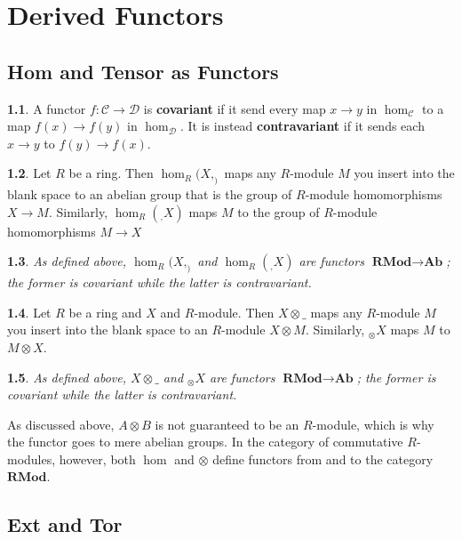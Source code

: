 \documentclass[oneside,english]{amsbook}
\numberwithin{section}{chapter}
\theoremstyle{plain}
\newtheorem{thm}{\protect\theoremname}
\theoremstyle{definition}
\newtheorem{defn}[thm]{\protect\definitionname}
\providecommand{\definitionname}{Definition}
\providecommand{\theoremname}{Theorem}
\begin{document}
	\chapter{Derived Functors}
	
		\section{Hom and Tensor as Functors}

			\begin{defn}
				A functor $f:\mathscr{C}\to \mathscr{D}$ is \textbf{covariant} if it send every map $x\to y$ in $\hom_\mathscr{C}$ to a map $f(x)\to f(y)$ in $\hom_\mathscr{D}$. It is instead \textbf{contravariant} if it sends each  $x\to y$ to $f(y)\to f(x)$.
			\end{defn}
			
			\begin{defn}
				Let $R$ be a ring. Then $\hom_R(X, _)$ maps any $R$-module $M$ you insert into the blank space to an abelian group that is the group of $R$-module homomorphisms $X\to M$. Similarly, $\hom_R(_, X)$ maps $M$ to the group of $R$-module homomorphisms $M\to X$
			\end{defn}
			
			\begin{thm}
				As defined above, $\hom_R(X, _)$ and $\hom_R(_, X)$ are functors $\textbf{RMod}\to \textbf{Ab}$; the former is covariant while the latter is contravariant.
			\end{thm}
			
			\begin{defn}
				Let $R$ be a ring and $X$ and $R$-module. Then $X\otimes \_ $ maps any $R$-module $M$ you insert into the blank space to an $R$-module $X\otimes M$. Similarly, $_\otimes X$ maps $M$ to $M\otimes X$.
			\end{defn}
			
			\begin{thm}
				As defined above, $X\otimes \_$ and $_\otimes X$ are functors  $\textbf{RMod}\to \textbf{Ab}$; the former is covariant while the latter is contravariant.
			\end{thm}
			
			As discussed above, $A\otimes B$ is not guaranteed to be an $R$-module, which is why the functor goes to mere abelian groups. In the category of commutative $R$-modules, however, both $\hom$ and $\otimes$ define functors from and to the category $\textbf{RMod}$.
			
	
		\section{Ext and Tor}
		
\end{document}
